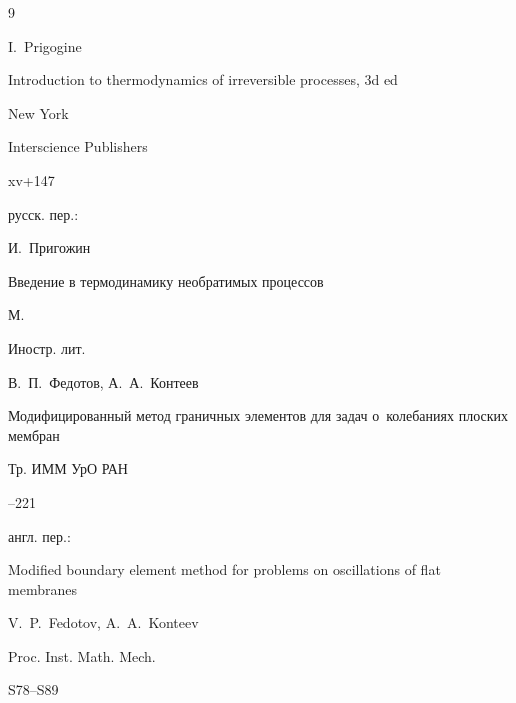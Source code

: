 {\begin{thebibliography}{9}




\by I.~Prigogine

\book  Introduction to thermodynamics of irreversible processes, 3d ed

\publaddr New York

\publ Interscience Publishers 


\totalpages xv+147

\rtransl русск. пер.:~

\by И.~Пригожин

\book Введение в термодинамику необратимых процессов

\publaddr М.

\publ Иностр. лит.






\by В.~П.~Федотов, А.~А.~Контеев

\paper Модифицированный метод граничных элементов для задач о~колебаниях плоских мембран

\jour Тр. ИММ УрО РАН




--221


\transl англ. пер.:~

\paper Modified boundary element method for problems on oscillations of flat membranes

\by V.~P.~Fedotov, A.~A.~Konteev

\jour Proc. Inst. Math. Mech.




\pages S78--S89










\end{thebibliography}}
